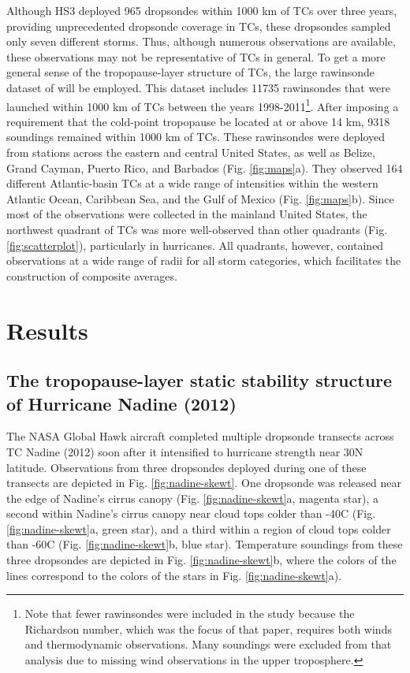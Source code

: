 Although HS3 deployed 965 dropsondes within 1000 km of TCs over three years, providing unprecedented dropsonde coverage in TCs, these dropsondes sampled only seven different storms.
Thus, although numerous observations are available, these observations may not be representative of TCs in general.
To get a more general sense of the tropopause-layer structure of TCs, the large rawinsonde dataset of \cite{DuranMolinari2016} will be employed.
This dataset includes 11735 rawinsondes that were launched within 1000 km of TCs between the years 1998-2011\footnote{Note that fewer rawinsondes were included in the \cite{DuranMolinari2016} study because the Richardson number, which was the focus of that paper, requires both winds and thermodynamic observations. Many soundings were excluded from that analysis due to missing wind observations in the upper troposphere.}.
After imposing a requirement that the cold-point tropopause be located at or above 14 km, 9318 soundings remained within 1000 km of TCs.
These rawinsondes were deployed from stations across the eastern and central United States, as well as Belize, Grand Cayman, Puerto Rico, and Barbados (Fig. \ref{fig:maps}a).
They observed 164 different Atlantic-basin TCs at a wide range of intensities within the western Atlantic Ocean, Caribbean Sea, and the Gulf of Mexico (Fig. \ref{fig:maps}b).
Since most of the observations were collected in the mainland United States, the northwest quadrant of TCs was more well-observed than other quadrants (Fig. \ref{fig:scatterplot}), particularly in hurricanes.
All quadrants, however, contained observations at a wide range of radii for all storm categories, which facilitates the construction of composite averages.

\section{Results}
\subsection{The tropopause-layer static stability structure of Hurricane Nadine (2012)}
The NASA Global Hawk aircraft completed multiple dropsonde transects across TC Nadine (2012) soon after it intensified to hurricane strength near 30\textdegree{}N latitude.
Observations from three dropsondes deployed during one of these transects are depicted in Fig. \ref{fig:nadine-skewt}.
One dropsonde was released near the edge of Nadine's cirrus canopy (Fig. \ref{fig:nadine-skewt}a, magenta star), a second within Nadine's cirrus canopy near cloud tops colder than -40\textdegree{}C (Fig. \ref{fig:nadine-skewt}a, green star), and a third within a region of cloud tops colder than -60\textdegree{}C (Fig. \ref{fig:nadine-skewt}b, blue star).
Temperature soundings from these three dropsondes are depicted in Fig. \ref{fig:nadine-skewt}b, where the colors of the lines correspond to the colors of the stars in Fig. \ref{fig:nadine-skewt}a).


